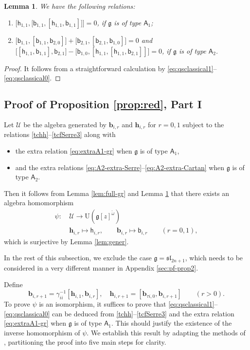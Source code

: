\documentclass[11pt,reqno]{amsart}
\numberwithin{equation}{section}
\newtheorem{lem}[thm]{Lemma}
\theoremstyle{definition}
\theoremstyle{remark}
\newcommand{\beq}{\begin{equation}}
\newcommand{\eeq}{\end{equation}}
\newcommand{\sfh}{\mathsf{h}}
\newcommand{\sfb}{\mathsf{b}}
\newcommand{\bb}{\mathbf{b}}
\newcommand{\bh}{\mathbf{h}}
\newcommand{\g}{\mathfrak{g}}
\begin{document}
\begin{lem}\label{lem:add-}
We have the following relations:
\begin{enumerate}
    \item $\big[\sfh_{1,1},\big[\sfb_{1,1},[\sfh_{1,1},\sfb_{1,1}]\big]\big]=0$, if $\g$ is of type $\mathsf A_1$;
    \item $\big[\sfb_{1,1},[\sfb_{1,1},\sfb_{2,0}]\big]
+
\big[\sfb_{2,1},[\sfb_{2,1},\sfb_{1,0}]\big]
=0$ and $\big[[\sfh_{1,1},\sfb_{1,1}],\sfb_{2,1}\big]
-
\big[\sfb_{1,0},
[\sfh_{1,1},[\sfh_{1,1},\sfb_{2,1}]]
\big]
=0$, if $\g$ is of type $\mathsf A_2$.
\end{enumerate}
\end{lem}
\begin{proof}
It follows from a straightforward calculation by \eqref{eq:qsclassical1}--\eqref{eq:qsclassical0}.
\end{proof}


\subsection{Proof of Proposition \ref{prop:red}, Part I}\label{sec:pf-prop1}
Let $\mathcal U$ be the algebra generated by $\bb_{i,r}$ and $\bh_{i,r}$ for $r=0,1$ subject to the relations \eqref{tchh}--\eqref{tcfSerre3} along with 
\begin{itemize}
    \item the extra relation \eqref{eq:extraA1-gr} when $\g$ is of type $\mathsf A_{1}$,
    \item and the extra relations \eqref{eq:A2-extra-Serre}--\eqref{eq:A2-extra-Cartan} when $\g$ is of type $\mathsf A_{2}$.
\end{itemize}
Then it follows from Lemma \ref{lem:full-gr} and Lemma \ref{lem:add-} that there exists an algebra homomorphism
\beq\label{eq:psi}
\begin{split}
\psi:~&\mathcal U\to \mathrm{U}(\g[z]^{\check\omega})\\
& \bh_{i,r}\mapsto \sfh_{i,r},\qquad \bb_{i,r}\mapsto \sfb_{i,r} \qquad (r=0,1),
\end{split}
\eeq
which is surjective by Lemma \ref{lem:gener}. 

In the rest of this subsection, we exclude the case $\g=\mathfrak{sl}_{2n+1}$, which needs to be considered in a very different manner in Appendix \ref{sec:pf-prop2}.

Define
\beq\label{bhdef}
\bb_{i,r+1}=\gamma_{ii}^{-1}[\bh_{i,1},\bb_{i,r}],\quad \bh_{i,r+1}=[\bb_{\tau i,0},\bb_{i,r+1}]\qquad (r>0).
\eeq
To prove $\psi$ is an isomorphism, it suffices to prove that \eqref{eq:qsclassical1}--\eqref{eq:qsclassical0} can be deduced from \eqref{tchh}--\eqref{tcfSerre3} and the extra relation \eqref{eq:extraA1-gr} when $\g$ is of type $\mathsf A_1$. This should justify the existence of the inverse homomorphism of $\psi$. We establish this result by adapting the methods of \cite{Lev93gen,GNW18,Lu26min}, partitioning the proof into five main steps for clarity.
\end{document}

